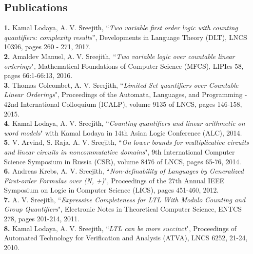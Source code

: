 \documentclass[margin]{res}
\begin{document}
\begin{resume}
\section{Publications}
{\bf 1.} Kamal Lodaya, A. V. Sreejith, ``\emph{Two variable first order logic with counting quantifiers: complexity results}'', Developments in Language Theory (DLT), LNCS 10396, pages 260 - 271, 2017. \\
{\bf 2.} Amaldev Manuel, A. V. Sreejith, ``\emph{Two variable logic over countable linear orderings}", Mathematical Foundations of Computer Science (MFCS), LIPIcs 58, pages 66:1-66:13, 2016. \\
{\bf 3.} Thomas Colcombet, A. V. Sreejith, ``\emph{Limited Set quantifiers over Countable Linear Orderings}", Proceedings of the Automata, Languages, and Programming - 42nd International Colloquium (ICALP), volume 9135 of LNCS, pages 146-158, 2015. \\
{\bf 4.} Kamal Lodaya, A. V. Sreejith, ``\emph{Counting quantifiers and linear arithmetic on word models}" with Kamal Lodaya in 14th Asian Logic Conference (ALC), 2014. \\
{\bf 5.} V. Arvind, S. Raja, A. V. Sreejith, ``\emph{On lower bounds for multiplicative circuits and linear circuits in noncommutative domains}", 9th International Computer Science Symposium in Russia (CSR), volume 8476 of LNCS, pages 65-76, 2014.\\
{\bf 6.} Andreas Krebs, A. V. Sreejith, ``\emph{Non-definability of Languages by Generalized First-order Formulas over (N, +)}", Proceedings of the 27th Annual IEEE Symposium on Logic in Computer Science (LICS),  pages 451-460, 2012.\\
{\bf 7.} A. V. Sreejith, ``\emph{Expressive Completeness for LTL With Modulo Counting and Group Quantifiers}", Electronic Notes in Theoretical Computer Science, ENTCS 278, pages 201-214, 2011.\\
{\bf 8.} Kamal Lodaya, A. V. Sreejith, ``\emph{LTL can be more succinct}", Proceedings of Automated Technology for Verification and Analysis (ATVA), LNCS 6252, 21-24, 2010.



\end{resume}
\end{document}
